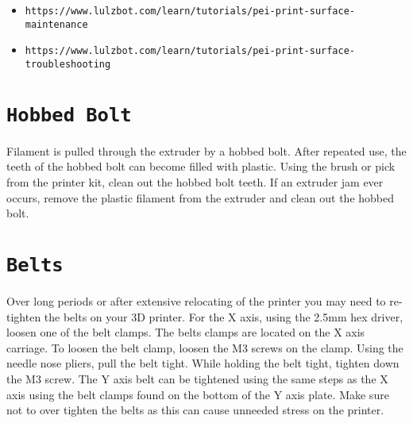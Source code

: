\begin{itemize}
\item \texttt{https://www.lulzbot.com/learn/tutorials/pei-print-surface-maintenance}
\item \texttt{https://www.lulzbot.com/learn/tutorials/pei-print-surface-troubleshooting}
\end{itemize}

\section{\texttt{Hobbed Bolt}}
Filament is pulled through the extruder by a hobbed bolt. After repeated use, the teeth of the hobbed bolt can become filled with plastic. Using the brush or pick from the printer kit, clean out the hobbed bolt teeth. If an extruder jam ever occurs, remove the plastic filament from the extruder and clean out the hobbed bolt.

\begin{comment}
\section{Software}
\index{software}
\index{download}
Aleph Objects, Inc.\textsuperscript{\miniscule{\textregistered}} will release a new stable version of Cura LulzBot\textsuperscript{\miniscule{\textregistered}} Edition, typically every quarter. It is best to update Cura every time a new version is released. Each software update can bring advances in print quality, reliability, and print times. The files are available at \texttt{http://lulzbot.com/cura}. You can also find updated software versions in the Download section at: \texttt{http://LulzBot.com/downloads}.
\end{comment}

\section{\texttt{Belts}}
Over long periods or after extensive relocating of the printer you may need to re-tighten the belts on your 3D printer. For the X axis, using the 2.5mm hex driver, loosen one of the belt clamps. The belts clamps are located on the X axis carriage. To loosen the belt clamp, loosen the M3 screws on the clamp. Using the needle nose pliers, pull the belt tight. While holding the belt tight, tighten down the M3 screw. The Y axis belt can be tightened using the same steps as the X axis using the belt clamps found on the bottom of the Y axis plate. Make sure not to over tighten the belts as this can cause unneeded stress on the printer.

